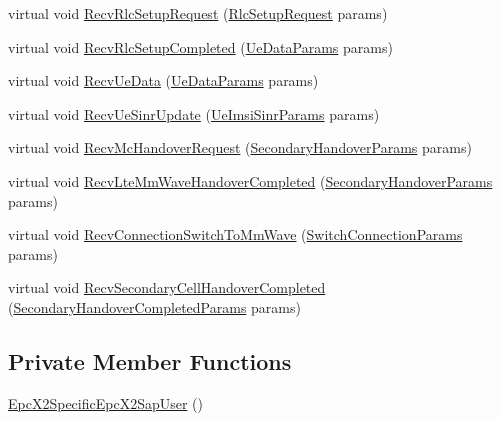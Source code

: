\begin{DoxyCompactItemize}
\item 
virtual void \hyperlink{classns3_1_1EpcX2SpecificEpcX2SapUser_ab80d1b9f6a52c9626b843c132a22407d}{Recv\+Rlc\+Setup\+Request} (\hyperlink{structns3_1_1EpcX2Sap_1_1RlcSetupRequest}{Rlc\+Setup\+Request} params)
\item 
virtual void \hyperlink{classns3_1_1EpcX2SpecificEpcX2SapUser_a1e038fc4a5ba9dcbc5e3b357e1a1a0c1}{Recv\+Rlc\+Setup\+Completed} (\hyperlink{structns3_1_1EpcX2Sap_1_1UeDataParams}{Ue\+Data\+Params} params)
\item 
virtual void \hyperlink{classns3_1_1EpcX2SpecificEpcX2SapUser_abf6141045ca489cacc94b03375673106}{Recv\+Ue\+Data} (\hyperlink{structns3_1_1EpcX2Sap_1_1UeDataParams}{Ue\+Data\+Params} params)
\item 
virtual void \hyperlink{classns3_1_1EpcX2SpecificEpcX2SapUser_a4817b4ecc3d935b494dcc6522de04d44}{Recv\+Ue\+Sinr\+Update} (\hyperlink{structns3_1_1EpcX2Sap_1_1UeImsiSinrParams}{Ue\+Imsi\+Sinr\+Params} params)
\item 
virtual void \hyperlink{classns3_1_1EpcX2SpecificEpcX2SapUser_afdee5a5bf7182012d54e74de796fc572}{Recv\+Mc\+Handover\+Request} (\hyperlink{structns3_1_1EpcX2Sap_1_1SecondaryHandoverParams}{Secondary\+Handover\+Params} params)
\item 
virtual void \hyperlink{classns3_1_1EpcX2SpecificEpcX2SapUser_a3f67143e254b42d40ae9620f5b6e9c52}{Recv\+Lte\+Mm\+Wave\+Handover\+Completed} (\hyperlink{structns3_1_1EpcX2Sap_1_1SecondaryHandoverParams}{Secondary\+Handover\+Params} params)
\item 
virtual void \hyperlink{classns3_1_1EpcX2SpecificEpcX2SapUser_a606009601442160756df418c585ce04c}{Recv\+Connection\+Switch\+To\+Mm\+Wave} (\hyperlink{structns3_1_1EpcX2Sap_1_1SwitchConnectionParams}{Switch\+Connection\+Params} params)
\item 
virtual void \hyperlink{classns3_1_1EpcX2SpecificEpcX2SapUser_aaef85986f38f1a1240aebdda21cd1f37}{Recv\+Secondary\+Cell\+Handover\+Completed} (\hyperlink{structns3_1_1EpcX2Sap_1_1SecondaryHandoverCompletedParams}{Secondary\+Handover\+Completed\+Params} params)
\end{DoxyCompactItemize}
\subsection*{Private Member Functions}
\begin{DoxyCompactItemize}
\item 
\hyperlink{classns3_1_1EpcX2SpecificEpcX2SapUser_ac1f9a6426ecefc802f04e30d3844a70c}{Epc\+X2\+Specific\+Epc\+X2\+Sap\+User} ()
\end{DoxyCompactItemize}
